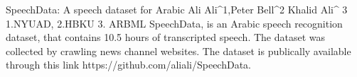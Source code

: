 SpeechData: A speech dataset for Arabic
Ali Ali^1,Peter Bell^2 Khalid Ali^ 3
1.NYUAD, 2.HBKU 3. ARBML
SpeechData, is an Arabic speech recognition dataset, that contains 10.5 hours of transcripted speech.
The dataset was collected by crawling news channel websites. 
The dataset is publically available through this link https://github.com/aliali/SpeechData.